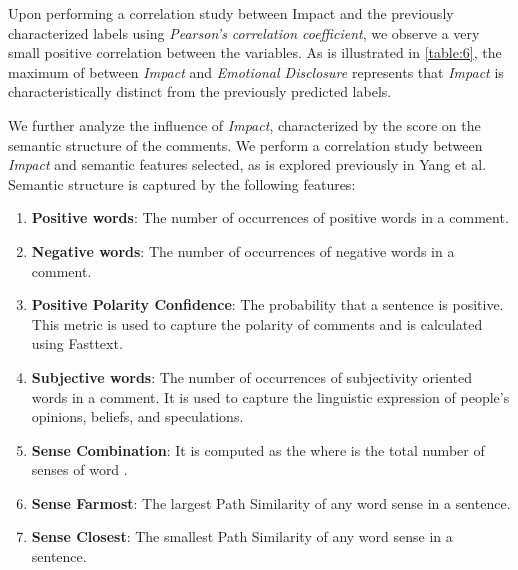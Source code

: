 \documentclass[runningheads]{llncs}
\begin{document}
\begin{table}[]
\centering
{}
\caption{The relationship between Labels and Impact, as represented by Pearson correlation coefficient, .}
\label{table:6}
\end{table}
Upon performing a correlation study between Impact and the previously characterized labels using \textit{Pearson’s correlation coefficient}\cite{Rodgers1988}, we observe a very small positive correlation between the variables. As is illustrated in \autoref{table:6}, the maximum  of  between \textit{Impact} and \textit{Emotional Disclosure} represents that \textit{Impact} is characteristically distinct from the previously predicted labels. 

We further analyze the influence of \textit{Impact}, characterized by the score on the semantic structure of the comments. We perform a correlation study between \textit{Impact} and semantic features selected, as is explored previously in Yang et al\cite{HumorRecognitionPaper}. Semantic structure is captured by the following features:  
\begin{enumerate}
    \item \textbf{Positive words}: The number of occurrences of positive words in a comment.
    \item \textbf{Negative words}: The number of occurrences of negative words in a comment.
    \item \textbf{Positive Polarity Confidence}: The probability that a sentence is positive. This metric is used to capture the polarity of comments and is calculated using Fasttext\cite{bojanowski2016enriching}.
    \item \textbf{Subjective words}: The number of occurrences of subjectivity oriented words in a comment. It is used to capture the linguistic expression of people’s opinions, beliefs, and speculations.
    \item \textbf{Sense Combination}: It is computed as the   where  is the total number of senses of word .
    \item \textbf{Sense Farmost}: The largest Path Similarity of any word sense in a sentence.
    \item \textbf{Sense Closest}: The smallest Path Similarity of any word sense in a sentence.
\end{enumerate}
\end{document}
